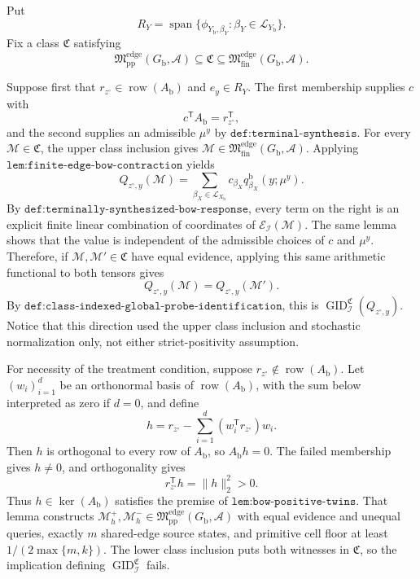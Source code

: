 Put
\[
R_Y=\operatorname{span}\{\phi_{Y_{\mathrm b},\beta_Y}:\beta_Y\in\mathcal L_{Y_{\mathrm b}}\}.
\]
Fix a class \(\mathfrak C\) satisfying
\[
\mathfrak M_{\mathrm{pp}}^{\mathrm{edge}}(G_{\mathrm b},\mathcal A)
\subseteq\mathfrak C
\subseteq\mathfrak M_{\mathrm{fin}}^{\mathrm{edge}}(G_{\mathrm b},\mathcal A).
\]

Suppose first that \(r_{z^{\circ}}\in\operatorname{row}(A_{\mathrm b})\) and \(e_y\in R_Y\).  The first membership supplies \(c\) with
\[
c^{\mathsf T}A_{\mathrm b}=r_{z^{\circ}}^{\mathsf T},
\]
and the second supplies an admissible \(\mu^y\) by \(\texttt{def:terminal-synthesis}\).  For every \(\mathcal M\in\mathfrak C\), the upper class inclusion gives \(\mathcal M\in\mathfrak M_{\mathrm{fin}}^{\mathrm{edge}}(G_{\mathrm b},\mathcal A)\).  Applying \(\texttt{lem:finite-edge-bow-contraction}\) yields
\[
Q_{z^{\circ},y}(\mathcal M)
=\sum_{\beta_X\in\mathcal L_{X_{\mathrm b}}}
c_{\beta_X}q^{\mathrm b}_{\beta_X}(y;\mu^y).
\]
By \(\texttt{def:terminally-synthesized-bow-response}\), every term on the right is an explicit finite linear combination of coordinates of \(\mathcal E_{\mathcal I}(\mathcal M)\).  The same lemma shows that the value is independent of the admissible choices of \(c\) and \(\mu^y\).  Therefore, if \(\mathcal M,\mathcal M'\in\mathfrak C\) have equal evidence, applying this same arithmetic functional to both tensors gives
\[
Q_{z^{\circ},y}(\mathcal M)=Q_{z^{\circ},y}(\mathcal M').
\]
By \(\texttt{def:class-indexed-global-probe-identification}\), this is \(\operatorname{GID}_{\mathcal I}^{\mathfrak C}(Q_{z^{\circ},y})\).  Notice that this direction used the upper class inclusion and stochastic normalization only, not either strict-positivity assumption.

For necessity of the treatment condition, suppose \(r_{z^{\circ}}\notin\operatorname{row}(A_{\mathrm b})\).  Let \((w_i)_{i=1}^d\) be an orthonormal basis of \(\operatorname{row}(A_{\mathrm b})\), with the sum below interpreted as zero if \(d=0\), and define
\[
h=r_{z^{\circ}}-\sum_{i=1}^d(w_i^{\mathsf T}r_{z^{\circ}})w_i.
\]
Then \(h\) is orthogonal to every row of \(A_{\mathrm b}\), so \(A_{\mathrm b}h=0\).  The failed membership gives \(h\neq0\), and orthogonality gives
\[
r_{z^{\circ}}^{\mathsf T}h=\lVert h\rVert_2^2>0.
\]
Thus \(h\in\ker(A_{\mathrm b})\) satisfies the premise of \(\texttt{lem:bow-positive-twins}\).  That lemma constructs \(\mathcal M_h^+,\mathcal M_h^-\in\mathfrak M_{\mathrm{pp}}^{\mathrm{edge}}(G_{\mathrm b},\mathcal A)\) with equal evidence and unequal queries, exactly \(m\) shared-edge source states, and primitive cell floor at least \(1/(2\max\{m,k\})\).  The lower class inclusion puts both witnesses in \(\mathfrak C\), so the implication defining \(\operatorname{GID}_{\mathcal I}^{\mathfrak C}\) fails.

